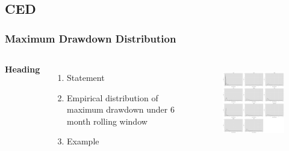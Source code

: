 \documentclass{beamer}
\newcommand\Fontviii{\fontsize{8}{9.2}\selectfont}
\begin{document}
\subsection{CED}

\begin{frame}
\frametitle{Maximum Drawdown Distribution}
\Fontviii
\begin{columns}[c] %

\textbf{Heading}
\begin{enumerate}
\item Statement
\item Empirical distribution of maximum drawdown under 6 month rolling window 
\item Example
\end{enumerate}

\begin{figure}[h]
\centering 
\includegraphics[width=6.5cm]{../results/maxdd_dist_mon6}
\label{fig: dist_mdd}
\end{figure}
\end{columns}
\end{frame}

\end{document}

